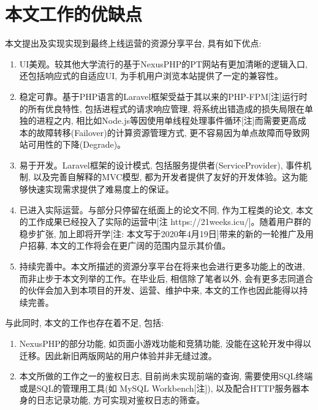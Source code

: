\section{本文工作的优缺点}

本文提出及实现实现到最终上线运营的资源分享平台, 具有如下优点:

\begin{enumerate}[label=\arabic*.,leftmargin=*]
\item UI美观。较其他大学流行的基于NexusPHP的PT网站有更加清晰的逻辑入口, 还包括响应式的自适应UI, 为手机用户浏览本站提供了一定的兼容性。

\item 稳定可靠。基于PHP语言的Laravel框架受益于其以来的PHP-FPM[注]运行时的所有优良特性, 包括进程式的请求响应管理, 将系统出错造成的损失局限在单独的进程之内, 相比如Node.js等因使用单线程处理事件循环[注]而需要更高成本的故障转移(Failover)的计算资源管理方式, 更不容易因为单点故障而导致网站可用性的下降(Degrade)。

\item 易于开发。Laravel框架的设计模式, 包括服务提供者(ServiceProvider), 事件机制, 以及完善自解释的MVC模型, 都为开发者提供了友好的开发体验。这为能够快速实现需求提供了难易度上的保证。

\item 已进入实际运营。与部分只停留在纸面上的论文不同, 作为工程类的论文, 本文的工作成果已经投入了实际的运营中[注 https://21weeks.icu/]。随着用户群的稳步扩张, 加上即将开学[注: 本文写于2020年4月19日]带来的新的一轮推广及用户招募, 本文的工作将会在更广阔的范围内显示其价值。

\item 持续完善中。本文所描述的资源分享平台在将来也会进行更多功能上的改进, 而非止步于本文列举的工作。在毕业后, 相信除了笔者以外, 会有更多志同道合的伙伴会加入到本项目的开发、运营、维护中来, 本文的工作也因此能得以持续完善。
\end{enumerate}


与此同时, 本文的工作也存在着不足, 包括:
\begin{enumerate}[label=\arabic*.,leftmargin=*]
\item NexusPHP的部分功能, 如页面小游戏功能和竞猜功能, 没能在这轮开发中得以迁移。因此新旧两版网站的用户体验并非无缝过渡。

\item 本文所做的工作之一的鉴权日志, 目前尚未实现前端的查询, 需要使用SQL终端或是SQL的管理用工具(如 MySQL Workbench[注]), 以及配合HTTP服务器本身的日志记录功能, 方可实现对鉴权日志的筛查。
\end{enumerate}

